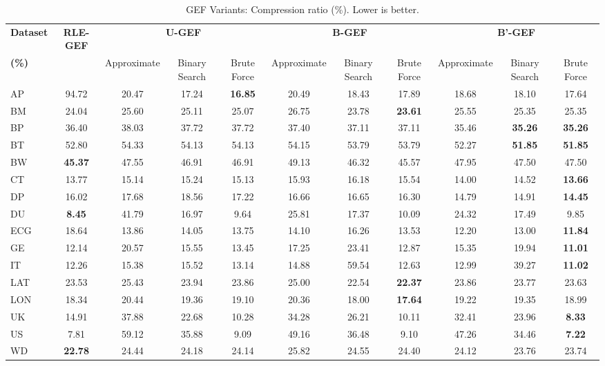 \begin{table*}[htbp]
\caption{GEF Variants: Compression ratio (\%). Lower is better.}
\label{tab:gef_ratio}
\centering
\small
\setlength{\tabcolsep}{4pt} %
\begin{tabular}{lcccccccccc}
\toprule
\textbf{Dataset} & \textbf{RLE-GEF} & \multicolumn{3}{c}{\textbf{U-GEF}} & \multicolumn{3}{c}{\textbf{B-GEF}} & \multicolumn{3}{c}{\textbf{B'-GEF}} \\
\textbf{(\%)} &   & Approximate & Binary Search & Brute Force & Approximate & Binary Search & Brute Force & Approximate & Binary Search & Brute Force \\
\cmidrule(lr){3-5} \cmidrule(lr){6-8} \cmidrule(lr){9-11} 
\midrule
AP & 94.72 & 20.47 & 17.24 & \textbf{16.85} & 20.49 & 18.43 & 17.89 & 18.68 & 18.10 & 17.64 \\
BM & 24.04 & 25.60 & 25.11 & 25.07 & 26.75 & 23.78 & \textbf{23.61} & 25.55 & 25.35 & 25.35 \\
BP & 36.40 & 38.03 & 37.72 & 37.72 & 37.40 & 37.11 & 37.11 & 35.46 & \textbf{35.26} & \textbf{35.26} \\
BT & 52.80 & 54.33 & 54.13 & 54.13 & 54.15 & 53.79 & 53.79 & 52.27 & \textbf{51.85} & \textbf{51.85} \\
BW & \textbf{45.37} & 47.55 & 46.91 & 46.91 & 49.13 & 46.32 & 45.57 & 47.95 & 47.50 & 47.50 \\
CT & 13.77 & 15.14 & 15.24 & 15.13 & 15.93 & 16.18 & 15.54 & 14.00 & 14.52 & \textbf{13.66} \\
DP & 16.02 & 17.68 & 18.56 & 17.22 & 16.66 & 16.65 & 16.30 & 14.79 & 14.91 & \textbf{14.45} \\
DU & \textbf{8.45} & 41.79 & 16.97 & 9.64 & 25.81 & 17.37 & 10.09 & 24.32 & 17.49 & 9.85 \\
ECG & 18.64 & 13.86 & 14.05 & 13.75 & 14.10 & 16.26 & 13.53 & 12.20 & 13.00 & \textbf{11.84} \\
GE & 12.14 & 20.57 & 15.55 & 13.45 & 17.25 & 23.41 & 12.87 & 15.35 & 19.94 & \textbf{11.01} \\
IT & 12.26 & 15.38 & 15.52 & 13.14 & 14.88 & 59.54 & 12.63 & 12.99 & 39.27 & \textbf{11.02} \\
LAT & 23.53 & 25.43 & 23.94 & 23.86 & 25.00 & 22.54 & \textbf{22.37} & 23.86 & 23.77 & 23.63 \\
LON & 18.34 & 20.44 & 19.36 & 19.10 & 20.36 & 18.00 & \textbf{17.64} & 19.22 & 19.35 & 18.99 \\
UK & 14.91 & 37.88 & 22.68 & 10.28 & 34.28 & 26.21 & 10.11 & 32.41 & 23.96 & \textbf{8.33} \\
US & 7.81 & 59.12 & 35.88 & 9.09 & 49.16 & 36.48 & 9.10 & 47.26 & 34.46 & \textbf{7.22} \\
WD & \textbf{22.78} & 24.44 & 24.18 & 24.14 & 25.82 & 24.55 & 24.40 & 24.12 & 23.76 & 23.74 \\
\bottomrule
\end{tabular}
\end{table*}
